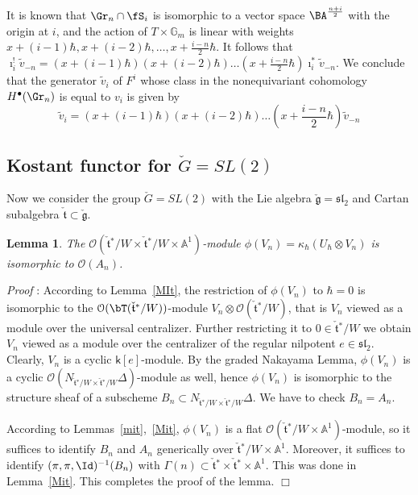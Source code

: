 \documentclass[11pt]{amsart}
\newtheorem{lem}{Lemma}
\theoremstyle{definition}
\theoremstyle{remark}
\renewcommand{\O}{{\mathcal O}}
\theoremstyle{remark}
\newcommand{\cal}{\mathcal}
\newcommand{\<}{\langle}
\renewcommand{\>}{\rangle}
\newcommand{\Lg}{\check{\mathfrak g}{}}
\newcommand{\Lt}{\check{\mathfrak t}{}}
\newcommand{\LG}{{\check{G}}}
\renewcommand{\O}{{\cal O}}
\newcommand{\Aone}{{\mathbb A}^1}
\newcommand{\Gm}{{{\mathbb G}_m}}
\newcommand{\kappah}{{\kappa_\hbar}}
\newcommand{\kk}{\mathsf k}
\renewcommand{\proof}{{\it Proof }}
\begin{document}
It is known that $\Gr_n\cap\fS_i$ is isomorphic to a vector space 
$\BA^{\frac{n+i}{2}}$ with the origin at $i$, and the action of $T\times\Gm$ is
linear with weights $x+(i-1)\hbar,x+(i-2)\hbar,\ldots,x+\frac{i-n}{2}\hbar$.
It follows that $\imath_i^!\tilde{v}_{-n}=(x+(i-1)\hbar)(x+(i-2)\hbar)\ldots
(x+\frac{i-n}{2}\hbar)\imath_i^*\tilde{v}_{-n}$.
We conclude that the generator $\tilde{v}_i$ 
of $F^i$ whose class in the nonequivariant
cohomology $H^\bullet(\Gr_n)$ is equal to $v_i$ is given by
\begin{equation}
\label{Idiot}
\tilde{v}_{i}=(x+(i-1)\hbar)(x+(i-2)\hbar)\ldots
(x+\frac{i-n}{2}\hbar)\tilde{v}_{-n}
\end{equation}

















\subsection{Kostant functor for $\LG=SL(2)$}
Now we consider the group $\LG=SL(2)$ with the Lie algebra 
$\Lg=\mathfrak{sl}_2$ and Cartan subalgebra $\Lt\subset\Lg$.

\begin{lem}
\label{alg}
The $\O(\Lt^*/W\times\Lt^*/W\times\Aone)$-module
$\phi(V_n)=\kappah(U_\hbar\otimes V_n)$ is isomorphic to $\O(A_n)$.
\end{lem}

\proof: According to Lemma~\ref{MIt}, 
the restriction of $\phi(V_n)$ to $\hbar=0$ is isomorphic to the
$\O(\bT(\Lt^*/W))$-module $V_n\otimes\O(\Lt^*/W)$, that is $V_n$ viewed
as a module over the universal centralizer. Further restricting it to 
$0\in\Lt^*/W$ we obtain $V_n$ viewed as a module over the centralizer of the
regular nilpotent $e\in\mathfrak{sl}_2$. Clearly, $V_n$ is a cyclic
$\kk[e]$-module. By the graded Nakayama Lemma, $\phi(V_n)$ is a cyclic
$\O(N_{\Lt^*/W\times\Lt^*/W}\Delta)$-module as well, hence $\phi(V_n)$ is
isomorphic to the structure sheaf of a subscheme 
$B_n\subset N_{\Lt^*/W\times\Lt^*/W}\Delta$. 
We have to check $B_n=A_n$. 

According to Lemmas~\ref{mit},~\ref{Mit}, $\phi(V_n)$ is a flat
$\O(\Lt^*/W\times\Aone)$-module, so it suffices to identify $B_n$ and
$A_n$ generically over $\Lt^*/W\times\Aone$. Moreover, it suffices to 
identify $(\pi,\pi,\Id)^{-1}(B_n)$ with 
$\Gamma(n)\subset\Lt^*\times\Lt^*\times\Aone$.
This was done in Lemma~\ref{Mit}.
This completes the proof of the lemma.
\hfill $\Box$
\end{document}
